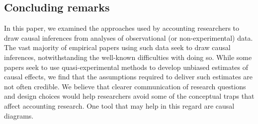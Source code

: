\documentclass[12pt,reqno,titlepage]{amsart}
\begin{document}
\begin{doublespace}



%
%
%


\section{Concluding remarks} \label{sec:conclude}
In this paper, we examined the approaches used by accounting researchers to draw causal inferences from analyses of observational (or non-experimental) data. 
The vast majority of empirical papers using such data seek to draw causal inferences, notwithstanding the well-known difficulties with doing so.
While some papers seek to use quasi-experimental methods to develop unbiased estimates of causal effects, we find that the assumptions required to deliver such estimates are not often credible. 
We believe that clearer communication of research questions and design choices would help researchers avoid some of the conceptual traps that affect 
accounting research.
One tool that may help in this regard are causal diagrams.


\end{doublespace}
\end{document}
